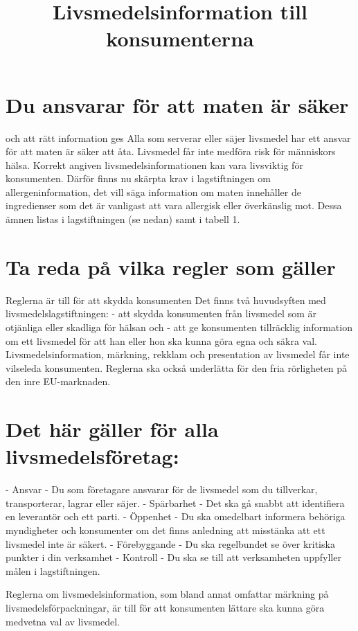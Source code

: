 \section*{Du ansvarar för att maten är säker} och att rätt information ges
Alla som serverar eller säjer livsmedel har ett ansvar för att maten är säker att åta. Livsmedel får inte medföra risk för människors hälsa.
Korrekt angiven livsmedelsinformationen kan vara livsviktig för konsumenten. Därför finns nu skärpta krav i lagstiftningen om allergeninformation, det vill säga information om maten innehåller de ingredienser som det är vanligast att vara allergisk eller överkänslig mot. Dessa ämnen listas i lagstiftningen (se nedan) samt i tabell 1.
\section*{Ta reda på vilka regler som gäller}
Reglerna är till för att skydda konsumenten Det finns två huvudsyften med livsmedelslagstiftningen:
- att skydda konsumenten från livsmedel som är otjänliga eller skadliga för hälsan och
- att ge konsumenten tillräcklig information om ett livsmedel för att han eller hon ska kunna göra egna och säkra val. Livsmedelsinformation, märkning, rekklam och presentation av livsmedel får inte vilseleda konsumenten.
Reglerna ska också underlätta för den fria rörligheten på den inre EU-marknaden.
\section*{Det här gäller för alla livsmedelsföretag:}
- Ansvar - Du som företagare ansvarar för de livsmedel som du tillverkar, transporterar, lagrar eller säjer.
- Spärbarhet - Det ska gå snabbt att identifiera en leverantör och ett parti.
- Öppenhet - Du ska omedelbart informera behöriga myndigheter och konsumenter om det finns anledning att misstänka att ett livsmedel inte är säkert.
- Förebyggande - Du ska regelbundet se över kritiska punkter i din verksamhet
- Kontroll - Du ska se till att verksamheten uppfyller målen i lagstiftningen.

\title{
Livsmedelsinformation till konsumenterna
}
Reglerna om livsmedelsinformation, som bland annat omfattar märkning på livsmedelsförpackningar, är till för att konsumenten lättare ska kunna göra medvetna val av livsmedel.
